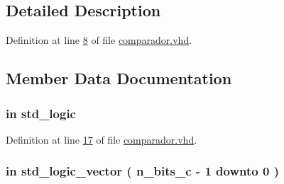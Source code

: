 \subsection{Detailed Description}


Definition at line \hyperlink{comparador_8vhd_source_l00008}{8} of file \hyperlink{comparador_8vhd_source}{comparador.\+vhd}.



\subsection{Member Data Documentation}
\hypertarget{classcomparador_af9b8278b961604ab62a822537a109adb}{}
\subsubsection[{amost}]{ {\bfseries \textcolor{keywordflow}{in}\textcolor{vhdlchar}{ }} {\bfseries \textcolor{comment}{std\+\_\+logic}\textcolor{vhdlchar}{ }} \hspace{0.3cm}{\ttfamily [Port]}}\label{classcomparador_af9b8278b961604ab62a822537a109adb}


Definition at line \hyperlink{comparador_8vhd_source_l00017}{17} of file \hyperlink{comparador_8vhd_source}{comparador.\+vhd}.

\hypertarget{classcomparador_a0808bf3e7965a8ee90dec6604647f179}{}
\subsubsection[{c}]{ {\bfseries \textcolor{keywordflow}{in}\textcolor{vhdlchar}{ }} {\bfseries \textcolor{comment}{std\+\_\+logic\+\_\+vector}\textcolor{vhdlchar}{ }\textcolor{vhdlchar}{(}\textcolor{vhdlchar}{ }\textcolor{vhdlchar}{ }\textcolor{vhdlchar}{ }\textcolor{vhdlchar}{ }{\bfseries {\bf n\+\_\+bits\+\_\+c}} \textcolor{vhdlchar}{-\/}\textcolor{vhdlchar}{ } \textcolor{vhdldigit}{1} \textcolor{vhdlchar}{ }\textcolor{keywordflow}{downto}\textcolor{vhdlchar}{ }\textcolor{vhdlchar}{ } \textcolor{vhdldigit}{0} \textcolor{vhdlchar}{ }\textcolor{vhdlchar}{)}\textcolor{vhdlchar}{ }} \hspace{0.3cm}{\ttfamily [Port]}}\label{classcomparador_a0808bf3e7965a8ee90dec6604647f179}


